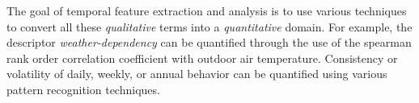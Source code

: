 The goal of temporal feature extraction and analysis is to use various techniques to convert all these \emph{qualitative} terms into a \emph{quantitative} domain. For example, the descriptor \emph{weather-dependency} can be quantified through the use of the spearman rank order correlation coefficient with outdoor air temperature. Consistency or volatility of daily, weekly, or annual behavior can be quantified using various pattern recognition techniques.